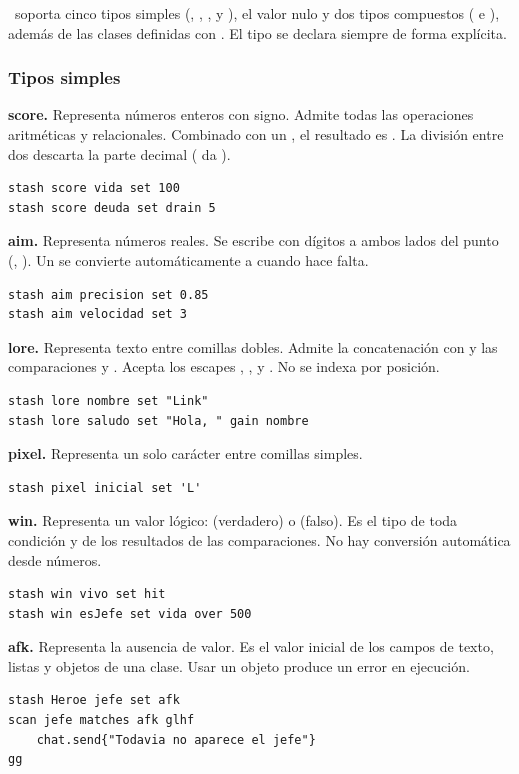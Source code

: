 \ggez\ soporta cinco tipos simples (, , ,  y ), el valor nulo  y dos tipos compuestos ( e ), además de las clases definidas con . El tipo se declara siempre de forma explícita.

\subsubsection{Tipos simples}

\textbf{score.} Representa números enteros con signo. Admite todas las operaciones aritméticas y relacionales. Combinado con un , el resultado es . La división entre dos  descarta la parte decimal ( da ).
\begin{lstlisting}
stash score vida set 100
stash score deuda set drain 5
\end{lstlisting}

\textbf{aim.} Representa números reales. Se escribe con dígitos a ambos lados del punto (, ). Un  se convierte automáticamente a  cuando hace falta.
\begin{lstlisting}
stash aim precision set 0.85
stash aim velocidad set 3
\end{lstlisting}

\textbf{lore.} Representa texto entre comillas dobles. Admite la concatenación con  y las comparaciones  y . Acepta los escapes , ,  y \kw{\textbackslash\textbackslash}. No se indexa por posición.
\begin{lstlisting}
stash lore nombre set "Link"
stash lore saludo set "Hola, " gain nombre
\end{lstlisting}

\textbf{pixel.} Representa un solo carácter entre comillas simples.
\begin{lstlisting}
stash pixel inicial set 'L'
\end{lstlisting}

\textbf{win.} Representa un valor lógico:  (verdadero) o  (falso). Es el tipo de toda condición y de los resultados de las comparaciones. No hay conversión automática desde números.
\begin{lstlisting}
stash win vivo set hit
stash win esJefe set vida over 500
\end{lstlisting}

\textbf{afk.} Representa la ausencia de valor. Es el valor inicial de los campos de texto, listas y objetos de una clase. Usar un objeto  produce un error en ejecución.
\begin{lstlisting}
stash Heroe jefe set afk
scan jefe matches afk glhf
    chat.send{"Todavia no aparece el jefe"}
gg
\end{lstlisting}

